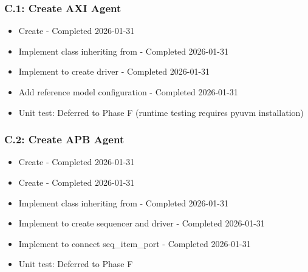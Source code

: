 \subsubsection{C.1: Create AXI Agent}\label{cr:status:pyuvm-migration:c1-create-axi-agent}

\begin{record}

\begin{itemize}
\tightlist
\item[$\boxtimes$]
  Create  - Completed
  2026-01-31
\item[$\boxtimes$]
  Implement  class inheriting from  -
  Completed 2026-01-31
\item[$\boxtimes$]
  Implement  to create driver - Completed 2026-01-31
\item[$\boxtimes$]
  Add reference model configuration - Completed 2026-01-31
\item[$\boxtimes$]
  Unit test: Deferred to Phase F (runtime testing requires pyuvm
  installation)
\end{itemize}

\end{record}

\subsubsection{C.2: Create APB Agent}\label{cr:status:pyuvm-migration:c2-create-apb-agent}

\begin{record}

\begin{itemize}
\tightlist
\item[$\boxtimes$]
  Create  - Completed
  2026-01-31
\item[$\boxtimes$]
  Create  -
  Completed 2026-01-31
\item[$\boxtimes$]
  Implement  class inheriting from  -
  Completed 2026-01-31
\item[$\boxtimes$]
  Implement  to create sequencer and driver -
  Completed 2026-01-31
\item[$\boxtimes$]
  Implement  to connect
  seq\_\allowbreak{}item\_\allowbreak{}port - Completed 2026-01-31
\item[$\boxtimes$]
  Unit test: Deferred to Phase F
\end{itemize}

\end{record}

